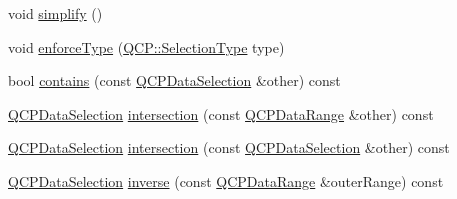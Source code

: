 \begin{DoxyCompactItemize}
void \hyperlink{classQCPDataSelection_a4a2fbad1a6e4d1dd26fdfdf88956f2a4}{simplify} ()
\item 
void \hyperlink{classQCPDataSelection_a17b84d852911531d229f4a76aa239a75}{enforce\+Type} (\hyperlink{namespaceQCP_ac6cb9db26a564b27feda362a438db038}{Q\+C\+P\+::\+Selection\+Type} type)
\item 
bool \hyperlink{classQCPDataSelection_a6d7c10d033031c7d1c66948ab8beab0f}{contains} (const \hyperlink{classQCPDataSelection}{Q\+C\+P\+Data\+Selection} \&other) const 
\item 
\hyperlink{classQCPDataSelection}{Q\+C\+P\+Data\+Selection} \hyperlink{classQCPDataSelection_a08371e0e97001f5f688047223123958b}{intersection} (const \hyperlink{classQCPDataRange}{Q\+C\+P\+Data\+Range} \&other) const 
\item 
\hyperlink{classQCPDataSelection}{Q\+C\+P\+Data\+Selection} \hyperlink{classQCPDataSelection_adc25bacbc7268595b684ab060de351d7}{intersection} (const \hyperlink{classQCPDataSelection}{Q\+C\+P\+Data\+Selection} \&other) const 
\item 
\hyperlink{classQCPDataSelection}{Q\+C\+P\+Data\+Selection} \hyperlink{classQCPDataSelection_a02c6253d87d72b8defbee2e6bfa8a494}{inverse} (const \hyperlink{classQCPDataRange}{Q\+C\+P\+Data\+Range} \&outer\+Range) const 
\end{DoxyCompactItemize}
